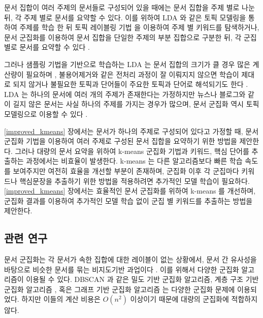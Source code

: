 \documentclass[11pt]{article}
\begin{document}
문서 집합이 여러 주제의 문서들로 구성되어 있을 때에는 문서 집합을 주제 별로 나눈 뒤, 각 주제 별로 문서를 요약할 수 있다.
이를 위하여 LDA \citep{blei2003latent} 와 같은 토픽 모델링을 통하여 주제를 학습 한 뒤 토픽 레이블링 기법 \citep{sievert2014ldavis} 을 이용하여 주제 별 키워드를 탐색하거나, 문서 군집화를 이용하여 문서 집합을 단일한 주제의 부분 집합으로 구분한 뒤, 각 군집별로 문서를 요약할 수 있다 \citep{wan2008multi, erkan2004lexpagerank, twinandilla2018multi}.

그러나 샘플링 기법을 기반으로 학습하는 LDA 는 문서 집합의 크기가 클 경우 많은 계산량이 필요하며 \citep{yuan2015lightlda}, 불용어제거와 같은 전처리 과정이 잘 이뤄지지 않으면 학습이 제대로 되지 않거나 불필요한 토픽과 단어들이 주요한 토픽과 단어로 해석되기도 한다 \citep{darling2011theoretical, newman2010evaluating}.
LDA 는 하나의 문서에 여러 개의 주제가 존재한다는 가정하지만 뉴스나 블로그와 같이 길지 않은 문서는 사실 하나의 주제를 가지는 경우가 많으며, 문서 군집화 역시 토픽 모델링으로 이용할 수 있다 \citep{dhillon2001concept, xu2003document, xie2013integrating}.

\ref{improved_kmeans} 장에서는 문서가 하나의 주제로 구성되어 있다고 가정할 때, 문서 군집화 기법을 이용하여 여러 주제로 구성된 문서 집합을 요약하기 위한 방법을 제안한다.
그러나 대량의 문서 요약을 위하여 k-means 군집화 기법과 키워드, 핵심 단어를 추출하는 과정에서는 비효율이 발생한다.
k-means 는 다른 알고리즘보다 빠른 학습 속도를 보여주지만 여전히 효율을 개선할 부분이 존재하며, 군집화 이후 각 군집마다 키워드나 핵심문장을 추출하기 위한 방법을 적용하려면 추가적인 모델 학습이 필요하다.
\ref{improved_kmeans} 장에서는 효율적인 문서 군집화를 위하여 k-means 를 개선하며, 군집화 결과를 이용하여 추가적인 모델 학습 없이 군집 별 키워드를 추출하는 방법을 제안한다.

\subsection{관련 연구}

문서 군집화는 각 문서가 속한 집합에 대한 레이블이 없는 상황에서, 문서 간 유사성을 바탕으로 비슷한 문서를 묶는 비지도기반 과업이다 \citep{xu2015comprehensive, yang2017towards, xie2016unsupervised}.
이를 위해서 다양한 군집화 알고리즘이 이용될 수 있다.
DBSCAN \citep{ester1996density}과 같은 밀도 기반 군집화 알고리즘, 계층 구조 기반 군집화 알고리즘 \citep{sibson1973slink}, 혹은 그래프 기반 군집화 알고리즘 \citep{clauset2004finding} 는 다양한 군집화 문제에 이용되었다.
하지만 이들의 계산 비용은 $O(n^2)$ 이상이기 때문에 대량의 군집화에 적합하지 않다.
\end{document}
